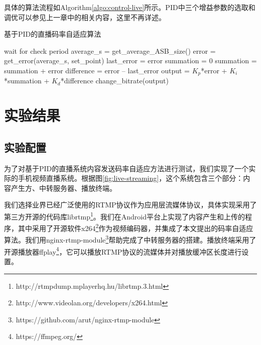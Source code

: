 具体的算法流程如Algorithm\ref{algo:control-live}所示。PID中三个增益参数的选取和调优可以参见上一章中的相关内容，这里不再详述。

\begin{algorithm}
	\caption{基于PID的直播码率自适应算法}
	\label{algo:control-live}
	\begin{algorithmic}
		\STATE wait for check period
		\STATE average\_s = get\_average\_ASB\_size()
		\STATE error = get\_error(average\_s, set\_point)
			\STATE last\_error = error
			\STATE summation = 0
		\ELSE
			\STATE summation = summation + error
			\STATE difference = error – last\_error
			\STATE output = $K_p$*error + $K_i$*summation + $K_d$*difference
			\STATE change\_bitrate(output)
		\ENDIF
		\ENDWHILE
	\end{algorithmic}
\end{algorithm}
	
\section{实验结果}

\subsection{实验配置}

为了对基于PID的直播系统内容发送码率自适应方法进行测试，我们实现了一个实际的手机视频直播系统。根据图\ref{fig:live-streaming}，这个系统包含三个部分：内容产生方、中转服务器、播放终端。

我们选择业界已经广泛使用的RTMP协议作为应用层流媒体协议，具体实现采用了第三方开源的代码库librtmp\footnote{http://rtmpdump.mplayerhq.hu/librtmp.3.html}。我们在Android平台上实现了内容产生和上传的程序，其中采用了开源软件x264\footnote{http://www.videolan.org/developers/x264.html}作为视频编码器，并集成了本文提出的码率自适应算法。我们用nginx-rtmp-module\footnote{https://github.com/arut/nginx-rtmp-module}帮助完成了中转服务器的搭建。播放终端采用了开源播放器ffplay\footnote{https://ffmpeg.org/}，它可以播放RTMP协议的流媒体并对播放缓冲区长度进行设置。

